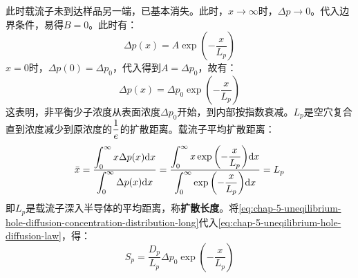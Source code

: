 此时载流子未到达样品另一端，已基本消失。此时，$x\rightarrow\infty$时，$\Delta p\rightarrow 0$。代入边界条件，易得$B=0$。此时有：
\begin{equation}
    \Delta p(x)=A\exp{\left(-\frac{x}{L_p}\right)}
\end{equation}
$x=0$时，$\Delta p(0)=\Delta p_0$，代入得到$A=\Delta p_0$，故有：
\begin{equation}
    \Delta p(x)=\Delta p_0\exp{\left(-\frac{x}{L_p}\right)}\label{eq:chap-5-uneqilibrium-hole-diffusion-concentration-distribution-long}
\end{equation}
这表明，非平衡少子浓度从表面浓度$\Delta p_0$开始，到内部按指数衰减。$L_p$是空穴复合直到浓度减少到原浓度的$\displaystyle\frac{1}{e}$的扩散距离。载流子平均扩散距离：
\begin{equation}
    \Bar{x}=\frac{\displaystyle\int_0^\infty x\Delta p(x)\mathrm{d}x}{\displaystyle\int_0^\infty \Delta p(x)\mathrm{d}x}=\frac{\displaystyle\int_0^\infty x\exp{\left(-\frac{x}{L_p}\right)}\mathrm{d}x}{\displaystyle\int_0^\infty\exp{\left(-\frac{x}{L_p}\right)}\mathrm{d}x}=L_p
\end{equation}
即$L_p$是载流子深入半导体的平均距离，称\textbf{扩散长度}。将\autoref{eq:chap-5-uneqilibrium-hole-diffusion-concentration-distribution-long}代入\autoref{eq:chap-5-uneqilibrium-hole-diffusion-law}，得：
\begin{equation}
    S_p=\frac{D_p}{L_p}\Delta p_0\exp{\left(-\frac{x}{L_p}\right)}
\end{equation}














